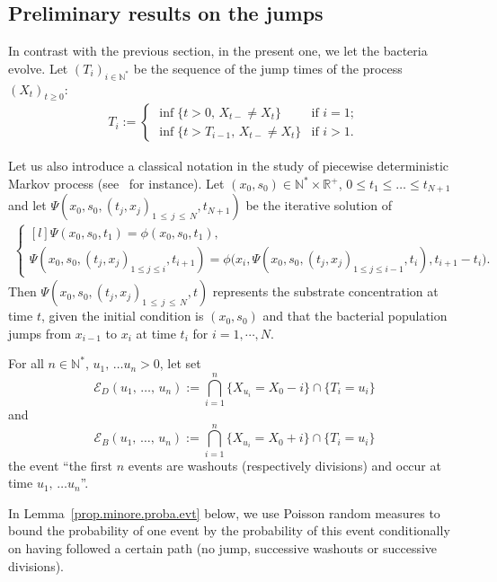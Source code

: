 \documentclass[10pt]{amsart}
\theoremstyle{definition}\newtheorem{defi}[theo]{Definition}\newtheorem{rema}[theo]{Remark}\newtheorem{exam}[theo]{Example}\newtheorem{exem}[theo]{Example}\newtheorem{nota}[theo]{Notation}
\newcommand{\RR}{\mathbb{R}}
\newcommand{\NN}{\mathbb{N}}
\newcommand{\clE}{\mathcal{E}}
\newcommand{\1}{\mathbf{1}}
\begin{document}
\subsection{Preliminary results on the jumps}\label{sec:preliminary.jumps}


In contrast with the previous section, in the present one, we let the bacteria evolve. Let $(T_i)_{i \in \NN^*}$ be the sequence of the jump times of the process $(X_t)_{t\geq 0}$:
\begin{align*}
T_i :=
\begin{cases}
\inf\{t> 0, \, X_{t-}\neq X_t\} & \text{if $i=1$};\\
\inf\{t>T_{ i-1}, \, X_{t-}\neq X_t\}& \text{if $i>1$.}
\end{cases}
\end{align*}

Let us also introduce a classical notation in the study of piecewise deterministic Markov process (see~\cite{BLMZ15} for instance). Let $(x_0,s_0)\in \NN^*\times \RR^+$, $0\leq t_1\leq \dots \leq t_{N+1}$ and let $\Psi\left(x_0,s_0,(t_j,x_j)_{1\,\leq\,j\,\leq\,N},t_{N+1}\right)$ be the iterative solution of
\begin{align}\label{eq:defPsi}
\left\{
\begin{matrix*}[l]
\Psi(x_0,s_0,t_1) = \phi(x_0,s_0,t_1), \\
\Psi\left(x_0,s_0,(t_j,x_j)_{1\leq j\leq i},t_{i+1}\right)
= \phi\Big(x_i,\Psi\left(x_0,s_0,(t_j,x_j)_{1\leq j\leq i-1},t_i\right), t_{i+1}-t_i\Big).
\end{matrix*}
\right.
\end{align}
Then $\Psi(x_0,s_0,(t_j,x_j)_{1\,\leq \,j\,\leq\,N},t)$ represents the substrate concentration at time $t$, given the initial condition is $(x_0,s_0)$ and that the bacterial population jumps from $x_{i-1}$ to $x_i$ at time $t_i$ for $i=1,\cdots,N$.


For all $n\in\NN^*$, $u_1,\,\dots u_n>0$, let set
\[
\clE_D(u_1,\,\dots,\,u_n):=\bigcap_{i=1}^{n}\{X_{u_i}=X_0 -i\} \cap \{T_i=u_i\}
\]
and
\[
\clE_B(u_1,\,\dots,\,u_n):=\bigcap_{i=1}^{n}\{X_{u_i}=X_0 +i\} \cap \{T_i=u_i\}
\]
the event ``the first $n$ events are washouts (respectively divisions) and occur at time $u_1,\,\dots u_n$''.


In Lemma~\ref{prop.minore.proba.evt} below, we use Poisson random measures to bound the probability of one event by the probability of this event conditionally on having followed a certain path (no jump, successive washouts or successive divisions).
\end{document}
